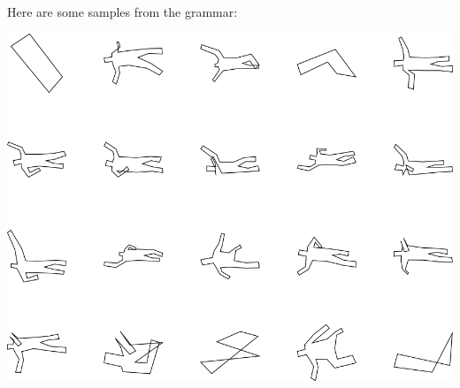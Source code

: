 Here are some samples from the grammar:

\includegraphics[width=6in]{output/3.learning/sdf_tuning/gram.3.d/samples.png}

